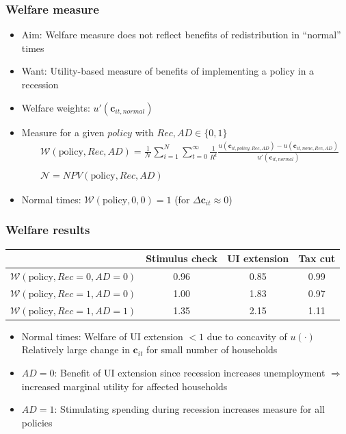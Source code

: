 \documentclass[pdflatex,aspectratio=169]{beamer}
\begin{document}
\begin{frame}
\frametitle{Welfare measure}
\begin{itemize}[<+->]
\item Aim: Welfare measure does not reflect benefits of redistribution in ``normal'' times
\item Want: Utility-based measure of benefits of implementing a policy in a recession
\item Welfare weights: $u'(\mathbf{c}_{it,\textit{normal}})$
\item Measure for a given $policy$ with $Rec,AD\in\{0,1\}$
\begin{align*}
& \mathcal{W}(\text{policy},Rec,AD) =\frac{1}{\mathcal{N}} \sum_{i=1}^{N} \sum_{t=0}^{\infty} \frac{1}{R^t} \frac{u(\mathbf{c}_{it,\textit{policy},Rec,AD}) - u(\mathbf{c}_{it,\textit{none},Rec,AD})}{ u'(\mathbf{c}_{it,\textit{normal}})} \\ \\ 
& \mathcal{N} = NPV(\text{policy},Rec,AD)
\end{align*}
\item Normal times: $\mathcal{W}(\text{policy},0,0) = 1$ (for $\Delta \mathbf{c}_{it}\approx 0$)
\end{itemize}
\end{frame}

\begin{frame}
	\frametitle{Welfare results}
	\centering 
	\begin{tabular}{@{}lccc@{}} 
		\toprule 
		& Stimulus check      & UI extension    & Tax cut    \\  \midrule 
		$\mathcal{W}(\text{policy}, Rec=0, AD=0)$ & 0.96  & 0.85  & 0.99     \\ 
		$\mathcal{W}(\text{policy}, Rec=1, AD=0)$ & 1.00  & 1.83  & 0.97     \\ 
		$\mathcal{W}(\text{policy}, Rec=1, AD=1)$ & 1.35  & 2.15  & 1.11     \\ \bottomrule
	\end{tabular} 
		\medskip
\begin{itemize}[<+->]
  \itemsep = .75\bigskipamount 
\item Normal times: Welfare of UI extension $< 1$ due to concavity of $u(\cdot)$ \\[1ex] 
Relatively large change in $\mathbf{c}_{it}$ for small number of households 
\item $AD=0$: Benefit of UI extension since recession increases unemployment $\Rightarrow$ increased marginal utility for affected households 
\item $AD=1$: Stimulating spending during recession increases measure for all policies 
\end{itemize}
\end{frame}
\end{document}
